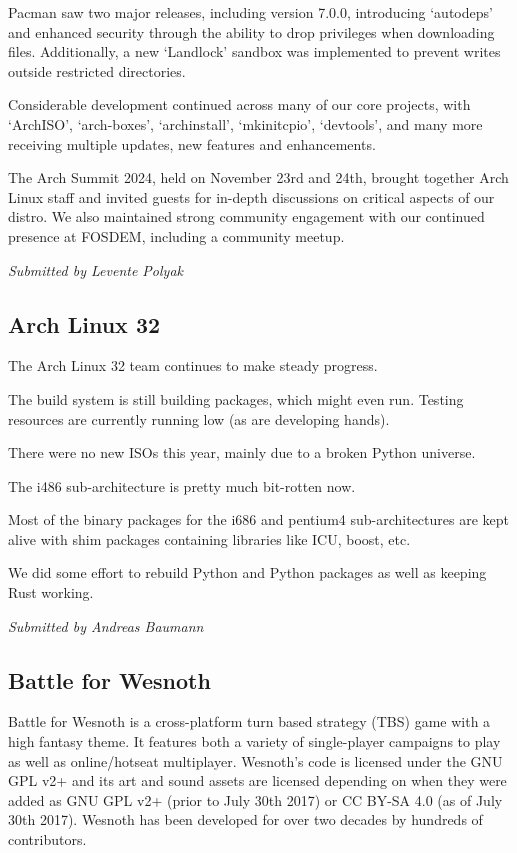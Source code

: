 \documentclass[a4paper]{report}
\begin{document}
Pacman saw two major releases, including version 7.0.0, introducing `autodeps' and enhanced security through the ability to drop privileges when downloading files. Additionally, a new `Landlock' sandbox was implemented to prevent writes outside restricted directories.

Considerable development continued across many of our core projects, with `ArchISO', `arch-boxes', `archinstall', `mkinitcpio', `devtools', and many more receiving multiple updates, new features and enhancements.

The Arch Summit 2024, held on November 23rd and 24th, brought together Arch Linux staff and invited guests for in-depth discussions on critical aspects of our distro. We also maintained strong community engagement with our continued presence at FOSDEM, including a community meetup.

{\em Submitted by Levente Polyak}

\subsection{Arch Linux 32}

The Arch Linux 32 team continues to make steady progress.

The build system is still building packages, which might even run. Testing resources are currently running low (as are developing hands).

There were no new ISOs this year, mainly due to a broken Python universe.

The i486 sub-architecture is pretty much bit-rotten now.

Most of the binary packages for the i686 and  pentium4 sub-architectures are kept alive with shim packages containing libraries like ICU, boost, etc.

We did some effort to rebuild Python and Python packages as well as keeping Rust working.

{\em Submitted by Andreas Baumann}

\subsection{Battle for Wesnoth}

Battle for Wesnoth is a cross-platform turn based strategy (TBS) game with a high fantasy theme. It features both a variety of single-player campaigns to play as well as online/hotseat multiplayer. Wesnoth's code is licensed under the GNU GPL v2+ and its art and sound assets are licensed depending on when they were added as GNU GPL v2+ (prior to July 30th 2017) or CC BY-SA 4.0 (as of July 30th 2017). Wesnoth has been developed for over two decades by hundreds of contributors.
\end{document}
